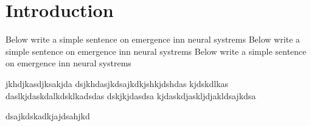 \documentclass[]{article}
\begin{document}
\section{Introduction}
Below write a simple sentence on emergence inn neural systrems
Below write a simple sentence on emergence inn neural systrems
Below write a simple sentence on emergence inn neural systrems

jkhdjkasdjksakjda
dsjkhdasjkdsajkdkjshkjdshdas
kjdskdlkas
daslkjdaskdalkdsklkadsdas
dskjkjdasdsa
kjdaskdjaskljdjakldsajkdsa

dsajkdskadkjajdsahjkd
\end{document}

